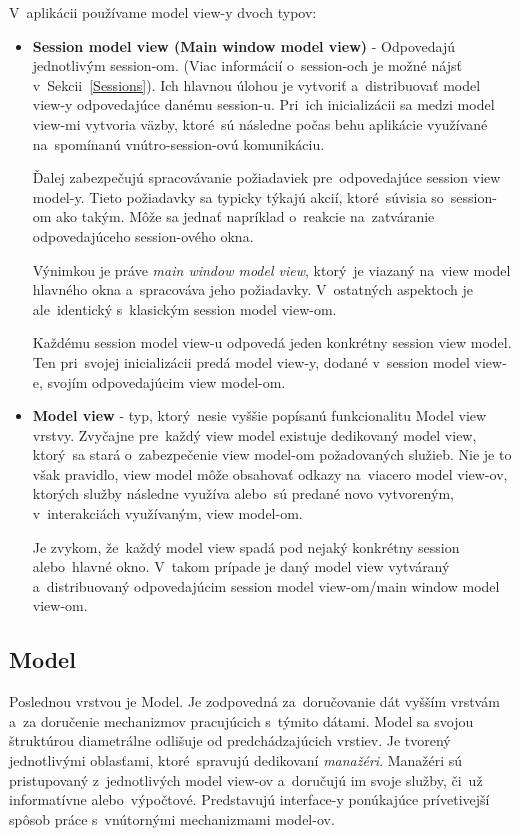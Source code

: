 V~aplikácii používame model view-y dvoch typov:
\begin{itemize}
    \item \textbf{Session model view (Main window model view)}  - Odpovedajú jednotlivým session-om. (Viac informácií o~session-och je možné nájsť v~Sekcii~\ref{Sessions}). Ich hlavnou úlohou je vytvoriť a~distribuovať model view-y odpovedajúce danému session-u. Pri~ich inicializácii sa medzi model view-mi vytvoria väzby, ktoré~sú následne počas behu aplikácie využívané na~spomínanú vnútro-session-ovú komunikáciu. 
    
    Ďalej zabezpečujú spracovávanie požiadaviek pre~odpovedajúce session view model-y. Tieto požiadavky sa typicky týkajú akcií, ktoré~súvisia so~session-om ako takým. Môže sa jednať napríklad o~reakcie na~zatváranie odpovedajúceho session-ového okna.  
    
    Výnimkou je práve \textit{main window model view}, ktorý~je viazaný na~view model hlavného okna a~spracováva jeho požiadavky. V~ostatných aspektoch je ale~identický s~klasickým session model view-om.
    
    Každému session model view-u odpovedá jeden konkrétny session view model. Ten pri~svojej inicializácii predá model view-y, dodané v~session model view-e, svojím odpovedajúcim view model-om.   
    \item \textbf{Model view} - typ, ktorý~nesie vyššie popísanú funkcionalitu Model view vrstvy. Zvyčajne pre~každý view model existuje dedikovaný model view, ktorý~sa stará o~zabezpečenie view model-om požadovaných služieb. Nie je to však pravidlo, view model môže obsahovať odkazy na~viacero model view-ov, ktorých služby následne využíva alebo~sú predané novo vytvoreným, v~interakciách využívaným, view model-om.

    Je zvykom, že~každý model view spadá pod nejaký konkrétny session alebo~hlavné okno. V~takom prípade je daný model view vytváraný a~distribuovaný odpovedajúcim session model view-om/main window model view-om.  
\end{itemize}

\subsection{Model}\label{model}

Poslednou  vrstvou je Model. Je zodpovedná za~doručovanie dát vyšším vrstvám a~za doručenie mechanizmov pracujúcich s~týmito dátami. Model sa svojou štruktúrou diametrálne odlišuje od predchádzajúcich vrstiev. Je tvorený jednotlivými oblasťami, ktoré~spravujú dedikovaní \textit{manažéri}. Manažéri sú pristupovaný z~jednotlivých model view-ov a~doručujú im svoje služby, či~už informatívne alebo~výpočtové. Predstavujú interface-y ponúkajúce prívetivejší spôsob práce s~vnútornými mechanizmami model-ov. 

